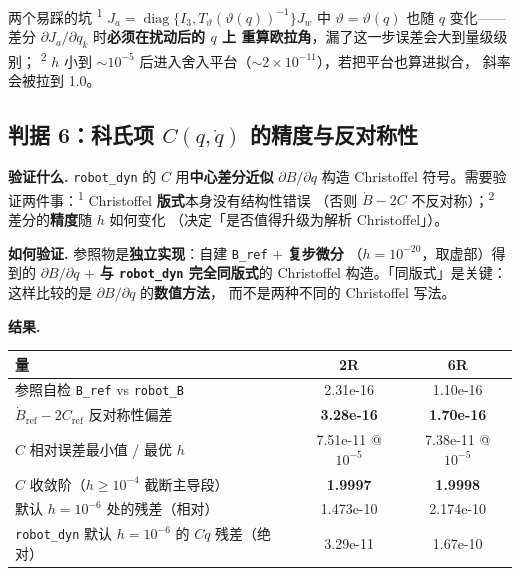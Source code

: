 \documentclass[11pt,a4paper]{ctexart}
\newcommand{\stage}[1]{\textsuperscript{#1}}
\begin{document}
\begin{warnbox}{两个易踩的坑}
\stage{1} $J_a=\operatorname{diag}\{I_3,T_\vartheta(\vartheta(q))^{-1}\}J_w$ 中
$\vartheta=\vartheta(q)$ 也随 $q$ 变化——差分 $\partial J_a/\partial q_k$ 时\textbf{必须在扰动后的 $q$ 上
重算欧拉角}，漏了这一步误差会大到量级级别；
\stage{2} $h$ 小到 $\sim10^{-5}$ 后进入舍入平台（$\sim2\times10^{-11}$），若把平台也算进拟合，
斜率会被拉到 1.0。
\end{warnbox}

\subsection{判据 6：科氏项 $C(q,\dot q)$ 的精度与反对称性}

\textbf{验证什么.} \texttt{robot\_dyn} 的 $C$ 用\textbf{中心差分近似} $\partial B/\partial q$ 构造
Christoffel 符号。需要验证两件事：\stage{1} Christoffel \textbf{版式}本身没有结构性错误
（否则 $\dot B-2C$ 不反对称）；\stage{2} 差分的\textbf{精度}随 $h$ 如何变化
（决定「是否值得升级为解析 Christoffel」）。

\textbf{如何验证.} 参照物是\textbf{独立实现}：自建 \texttt{B\_ref} + \textbf{复步微分}
（$h=10^{-20}$，取虚部）得到的 $\partial B/\partial q$ + \textbf{与 \texttt{robot\_dyn} 完全同版式}的
Christoffel 构造。「同版式」是关键：这样比较的是 $\partial B/\partial q$ 的\textbf{数值方法}，
而不是两种不同的 Christoffel 写法。

\textbf{结果.}

\begin{table}[H]
\centering
\small
\begin{tabular}{@{}lcc@{}}
\toprule
量 & 2R & 6R \\
\midrule
参照自检 \texttt{B\_ref} vs \texttt{robot\_B} & 2.31e-16 & 1.10e-16 \\
$\dot B_{\mathrm{ref}}-2C_{\mathrm{ref}}$ 反对称性偏差 & \textbf{3.28e-16} & \textbf{1.70e-16} \\
$C$ 相对误差最小值 / 最优 $h$ & 7.51e-11 @ $10^{-5}$ & 7.38e-11 @ $10^{-5}$ \\
$C$ 收敛阶（$h\ge10^{-4}$ 截断主导段） & \textbf{1.9997} & \textbf{1.9998} \\
默认 $h=10^{-6}$ 处的残差（相对） & 1.473e-10 & 2.174e-10 \\
\texttt{robot\_dyn} 默认 $h=10^{-6}$ 的 $C\dot q$ 残差（绝对） & 3.29e-11 & 1.67e-10 \\
\bottomrule
\end{tabular}
\end{table}
\end{document}
